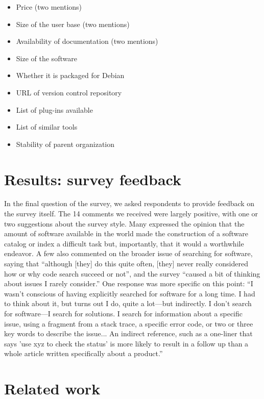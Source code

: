 \documentclass{casicswhitepaper}
\begin{document}
\begin{itemize}[itemsep=-0.5ex]

\item Price (two mentions)
\item Size of the user base (two mentions)
\item Availability of documentation (two mentions)
\item Size of the software
\item Whether it is packaged for Debian
\item URL of version control repository
\item List of plug-ins available
\item List of similar tools
\item Stability of parent organization

\end{itemize}


\section{Results: survey feedback}

In the final question of the survey, we asked respondents to provide feedback on the survey itself.  The 14 comments we received were largely positive, with one or two suggestions about the survey style. Many expressed the opinion that the amount of software available in the world made the construction of a software catalog or index a difficult task but, importantly, that it would a worthwhile endeavor. A few also commented on the broader issue of searching for software, saying that ``although [they] do this quite often, [they] never really considered how or why code search succeed or not'', and the survey ``caused a bit of thinking about issues I rarely consider.'' One response was more specific on this point: ``I wasn't conscious of having explicitly searched for software for a long time. I had to think about it, but turns out I do, quite a lot---but indirectly. I don't search for software---I search for solutions. I search for information about a specific issue, using a fragment from a stack trace, a specific error code, or two or three key words to describe the issue... An indirect reference, such as a one-liner that says 'use xyz to check the status' is more likely to result in a follow up than a whole article written specifically about a product.''


\section{Related work}
\end{document}
